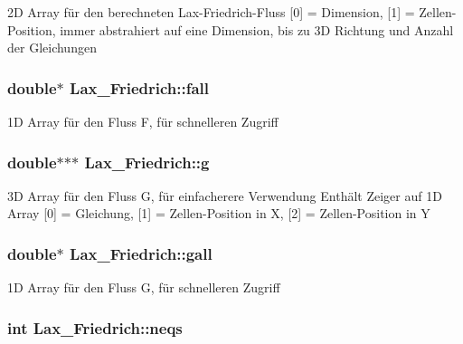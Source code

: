 2\-D Array für den berechneten Lax-\/\-Friedrich-\/\-Fluss \mbox{[}0\mbox{]} = Dimension, \mbox{[}1\mbox{]} = Zellen-\/\-Position, immer abstrahiert auf eine Dimension, bis zu 3\-D Richtung und Anzahl der Gleichungen \hypertarget{classLax__Friedrich_ad04ba32ac42deeae836e2acc594f7b52}{
\subsubsection[{fall}]{\setlength{\rightskip}{0pt plus 5cm}double$\ast$ Lax\-\_\-\-Friedrich\-::fall\hspace{0.3cm}{\ttfamily [protected]}}}\label{classLax__Friedrich_ad04ba32ac42deeae836e2acc594f7b52}
1\-D Array für den Fluss F, für schnelleren Zugriff \hypertarget{classLax__Friedrich_a78574df783b04827507ad183522ee021}{
\subsubsection[{g}]{\setlength{\rightskip}{0pt plus 5cm}double$\ast$$\ast$$\ast$ Lax\-\_\-\-Friedrich\-::g\hspace{0.3cm}{\ttfamily [protected]}}}\label{classLax__Friedrich_a78574df783b04827507ad183522ee021}
3\-D Array für den Fluss G, für einfacherere Verwendung Enthält Zeiger auf 1\-D Array \mbox{[}0\mbox{]} = Gleichung, \mbox{[}1\mbox{]} = Zellen-\/\-Position in X, \mbox{[}2\mbox{]} = Zellen-\/\-Position in Y \hypertarget{classLax__Friedrich_a46a918bceab80d7a6f2042a2e96cf4bd}{
\subsubsection[{gall}]{\setlength{\rightskip}{0pt plus 5cm}double$\ast$ Lax\-\_\-\-Friedrich\-::gall\hspace{0.3cm}{\ttfamily [protected]}}}\label{classLax__Friedrich_a46a918bceab80d7a6f2042a2e96cf4bd}
1\-D Array für den Fluss G, für schnelleren Zugriff \hypertarget{classLax__Friedrich_a54f821dda8e829ce85adc3afc77dce49}{
\subsubsection[{neqs}]{\setlength{\rightskip}{0pt plus 5cm}int Lax\-\_\-\-Friedrich\-::neqs\hspace{0.3cm}{\ttfamily [protected]}}}\label{classLax__Friedrich_a54f821dda8e829ce85adc3afc77dce49}
